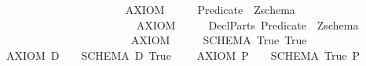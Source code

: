 \begin{isabellebody}
\ \ \ \ \ \ \ \ \ \ \ \ \ \ \ \ \ \ \ {\isacharparenleft}{\isachardoublequoteopen}{\isacharplus}{\isachardot}{\isachardot}{\isacharslash}{\isacharslash}{\isacharparenleft}{}\ {\isacharunderscore}{\isacharparenright}{\isacharslash}{\isacharslash}{\isacharminus}{\isachardot}{\isachardot}{\isachardoublequoteclose}{\isacharparenright}\ \isanewline
\ \ {\isachardoublequoteopen}{\isacharunderscore}AXIOM{}{\isachardoublequoteclose}\ \ \ \ \ {\isacharcolon}{\isacharcolon}\ {\isachardoublequoteopen}Predicate\ {\isacharequal}{\isachargreater}\ Zschema{\isachardoublequoteclose}\ \ \isanewline
\ \ \ \ \ \ \ \ \ \ \ \ \ \ \ \ \ \ \ {\isacharparenleft}{\isachardoublequoteopen}{\isacharplus}{\isachardot}{\isachardot}\ {\isacharslash}{\isacharslash}{\isacharbar}{\isacharminus}{\isacharminus}\ {\isacharslash}{\isacharslash}{\isacharparenleft}{}\ {\isacharunderscore}{\isacharparenright}{\isacharslash}{\isacharslash}{\isacharminus}{\isachardot}{\isachardot}{\isachardoublequoteclose}{\isacharparenright}\ \isanewline
\ \ {\isachardoublequoteopen}{\isacharunderscore}AXIOM{}{\isachardoublequoteclose}\ \ \ \ \ {\isacharcolon}{\isacharcolon}\ {\isachardoublequoteopen}{\isacharbrackleft}DeclParts{\isacharcomma}\ Predicate{\isacharbrackright}\ {\isacharequal}{\isachargreater}\ Zschema{\isachardoublequoteclose}\ \ \isanewline
\ \ \ \ \ \ \ \ \ \ \ \ \ \ \ \ \ \ \ {\isacharparenleft}{\isachardoublequoteopen}{\isacharplus}{\isachardot}{\isachardot}{\isacharslash}{\isacharslash}{\isacharparenleft}{}\ {\isacharunderscore}{\isacharparenright}{\isacharslash}{\isacharslash}{\isacharbar}{\isacharminus}{\isacharminus}{\isacharslash}{\isacharslash}{\isacharparenleft}{}\ {\isacharunderscore}{\isacharparenright}{\isacharslash}{\isacharslash}{\isacharminus}{\isachardot}{\isachardot}{\isachardoublequoteclose}{\isacharparenright}\ \isanewline
\isanewline
{}\isamarkupfalse%
\isanewline
\ \ {\isachardoublequoteopen}{\isacharunderscore}AXIOM{}{\isachardoublequoteclose}\ \ \ \ \ {\isacharequal}{\isacharequal}\ {\isachardoublequoteopen}SCHEMA\ True\ True{\isachardoublequoteclose}\ \isanewline
\ \ {\isachardoublequoteopen}{\isacharunderscore}AXIOM{}\ D{\isachardoublequoteclose}\ \ \ {\isacharequal}{\isacharequal}\ {\isachardoublequoteopen}SCHEMA\ D\ True\ {\isachardoublequoteclose}\ \isanewline
\ \ {\isachardoublequoteopen}{\isacharunderscore}AXIOM{}\ P{\isachardoublequoteclose}\ \ \ {\isacharequal}{\isacharequal}\ {\isachardoublequoteopen}SCHEMA\ True\ P{\isachardoublequoteclose}\ \ \isanewline

\end{isabellebody}
